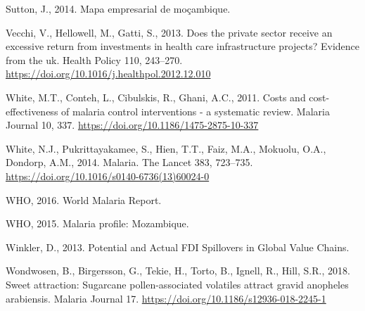 \documentclass[]{article}
\begin{document}
\hypertarget{ref-sutton}{}
Sutton, J., 2014. Mapa empresarial de moçambique.

\hypertarget{ref-Vecchi_2013}{}
Vecchi, V., Hellowell, M., Gatti, S., 2013. Does the private sector
receive an excessive return from investments in health care
infrastructure projects? Evidence from the uk. Health Policy 110,
243--270. \url{https://doi.org/10.1016/j.healthpol.2012.12.010}

\hypertarget{ref-White_2011}{}
White, M.T., Conteh, L., Cibulskis, R., Ghani, A.C., 2011. Costs and
cost-effectiveness of malaria control interventions - a systematic
review. Malaria Journal 10, 337.
\url{https://doi.org/10.1186/1475-2875-10-337}

\hypertarget{ref-White2014}{}
White, N.J., Pukrittayakamee, S., Hien, T.T., Faiz, M.A., Mokuolu, O.A.,
Dondorp, A.M., 2014. Malaria. The Lancet 383, 723--735.
\url{https://doi.org/10.1016/s0140-6736(13)60024-0}

\hypertarget{ref-World2016}{}
WHO, 2016. World Malaria Report.

\hypertarget{ref-whoprof}{}
WHO, 2015. Malaria profile: Mozambique.

\hypertarget{ref-Winkler}{}
Winkler, D., 2013. Potential and Actual FDI Spillovers in Global Value
Chains.

\hypertarget{ref-Wondwosen2018}{}
Wondwosen, B., Birgersson, G., Tekie, H., Torto, B., Ignell, R., Hill,
S.R., 2018. Sweet attraction: Sugarcane pollen-associated volatiles
attract gravid anopheles arabiensis. Malaria Journal 17.
\url{https://doi.org/10.1186/s12936-018-2245-1}
\end{document}
